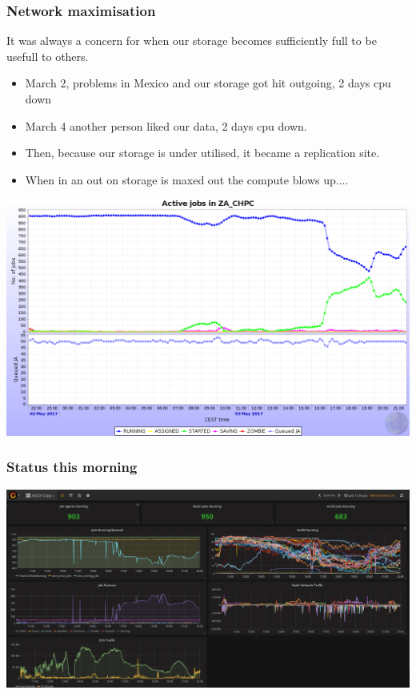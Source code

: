 \documentclass{beamer}
\begin{document}
\begin{frame}
    \frametitle{Network maximisation}
It was always a concern for when our storage becomes sufficiently full to be usefull to others.
    \begin{itemize}
            \item March 2, problems in Mexico and our storage got hit outgoing, 2 days cpu down
            \item March 4 another person liked our data, 2 days cpu down.
                \item Then, because our storage is under utilised, it became a replication site.
                    \item When in an out on storage is maxed out the compute blows up....
    \end{itemize}
    \includegraphics[scale=0.15]{ALICEMonaLisa-ShowingStartingJobs.png}
\end{frame}
\begin{frame}
    \frametitle{Status this morning}
    \includegraphics[scale=0.25]{ALICEGrafanaStatus-20170503.png}\\
\end{frame}
\end{document}
